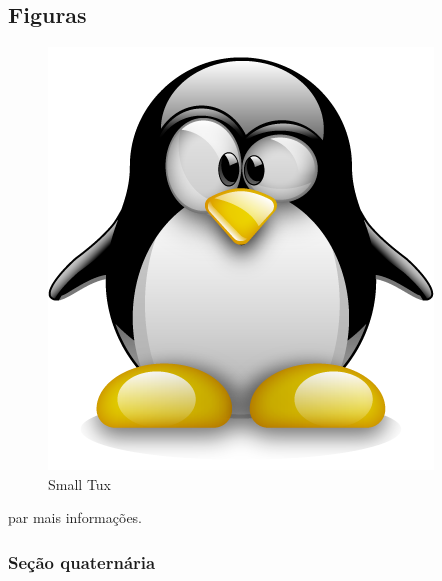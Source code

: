 \subsection{Figuras}
\begin{figure}[htb]
	\caption{\label{fig_grafico}Small Tux}
	\begin{center}
	    \includegraphics[scale=0.2]{figuras/tux.png}
	\end{center}
\end{figure}

\lipsum[1-2]

 par mais informações.

\subsubsection{Seção quaternária}
\lipsum[1-1]